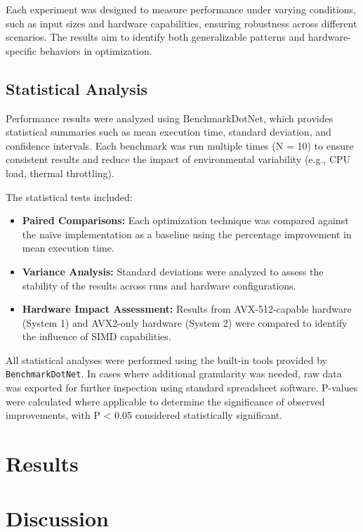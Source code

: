 \documentclass{article}
\begin{document}
Each experiment was designed to measure performance under varying conditions, such as input sizes and hardware capabilities, ensuring robustness across different scenarios. The results aim to identify both generalizable patterns and hardware-specific behaviors in optimization.

\subsection{Statistical Analysis}

Performance results were analyzed using BenchmarkDotNet, which provides statistical summaries such as mean execution time, standard deviation, and confidence intervals. Each benchmark was run multiple times (N = 10) to ensure consistent results and reduce the impact of environmental variability (e.g., CPU load, thermal throttling).

The statistical tests included:
\begin{itemize}
    \item \textbf{Paired Comparisons:} Each optimization technique was compared against the naïve implementation as a baseline using the percentage improvement in mean execution time.
    \item \textbf{Variance Analysis:} Standard deviations were analyzed to assess the stability of the results across runs and hardware configurations.
    \item \textbf{Hardware Impact Assessment:} Results from AVX-512-capable hardware (System 1) and AVX2-only hardware (System 2) were compared to identify the influence of SIMD capabilities.
\end{itemize}

All statistical analyses were performed using the built-in tools provided by \texttt{BenchmarkDotNet}. In cases where additional granularity was needed, raw data was exported for further inspection using standard spreadsheet software. P-values were calculated where applicable to determine the significance of observed improvements, with P < 0.05 considered statistically significant.

\section{Results}

\section{Discussion}
\end{document}
